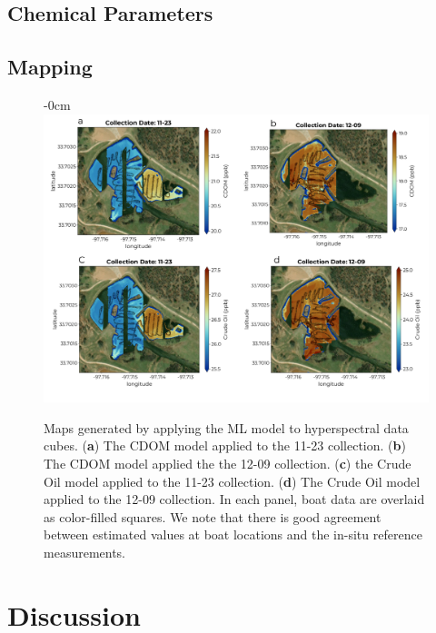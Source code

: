 \documentclass[journal,article,submit,pdftex,moreauthors]{Definitions/mdpi}
\begin{document}
\subsection{Chemical Parameters}


\subsection{Mapping}

\begin{figure}[H]
\begin{adjustwidth}{-\extralength}{0cm}
\centering
\includegraphics[width=18.0cm]{paper/figures/results/map-combined.pdf}
\end{adjustwidth}
\caption{Maps generated by applying the ML model to hyperspectral data cubes. (\textbf{a}) The CDOM model applied to the 11-23 collection. (\textbf{b}) The CDOM model applied the the 12-09 collection. (\textbf{c}) the Crude Oil model applied to the 11-23 collection. (\textbf{d}) The Crude Oil model applied to the 12-09 collection. In each panel, boat data are overlaid as color-filled squares. We note that there is good agreement between estimated values at boat locations and the in-situ reference measurements. \label{fig:maps}}
\end{figure}  


\section{Discussion} \label{sec:discussion}
\end{document}
